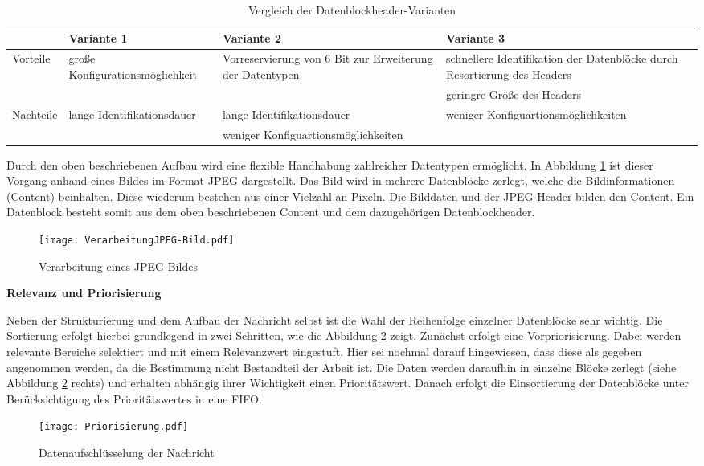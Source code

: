 \begin{longtable}[\textwidth]{|l|p{}|p{}|p{}|}
\caption{Vergleich der Datenblockheader-Varianten} \\
	\hline
	\label{tab:VorNachteileHeaderVarianten}
	\textbf{} & \textbf{Variante 1} & \textbf{Variante 2} & \textbf{Variante 3}\\
	\hline
	  Vorteile      &  große Konfigurationsmöglichkeit & Vorreservierung von $6$
	  Bit zur Erweiterung der Datentypen & schnellere Identifikation der
	  Datenblöcke durch Resortierung des Headers\\
	  & & & geringre Größe des Headers \\
	\hline
	  Nachteile      &  lange Identifikationsdauer & lange Identifikationsdauer &
	  weniger Konfiguartionsmöglichkeiten\\
	  & & weniger Konfiguartionsmöglichkeiten & \\
	\hline
\end{longtable}

Durch den oben beschriebenen Aufbau wird eine flexible Handhabung
zahlreicher Datentypen ermöglicht. In Abbildung \ref{fig:beispielJPG} ist
dieser Vorgang anhand eines Bildes im Format JPEG dargestellt. Das Bild wird in
mehrere Datenblöcke zerlegt, welche die Bildinformationen (Content) beinhalten.
Diese wiederum bestehen aus einer Vielzahl an Pixeln.
Die Bilddaten und der JPEG-Header bilden den Content. Ein Datenblock besteht
somit aus dem oben beschriebenen Content und dem dazugehörigen
Datenblockheader.

\begin{figure}[H]
	\centering
	\texttt{[image: VerarbeitungJPEG-Bild.pdf]}
	\caption{Verarbeitung eines JPEG-Bildes}
	\label{fig:beispielJPG}
\end{figure}

\textbf{Relevanz und Priorisierung}

Neben der Strukturierung und dem Aufbau der Nachricht selbst ist die
Wahl der Reihenfolge einzelner Datenblöcke sehr wichtig. Die Sortierung erfolgt
hierbei grundlegend in zwei Schritten, wie die Abbildung \ref{fig:priorisierungen}
zeigt. Zunächst erfolgt eine Vorpriorisierung. Dabei werden relevante Bereiche
selektiert und mit einem Relevanzwert eingestuft. Hier sei nochmal darauf
hingewiesen, dass diese als gegeben angenommen werden, da die Bestimmung nicht
Bestandteil der Arbeit ist. Die Daten werden daraufhin in einzelne Blöcke
zerlegt (siehe Abbildung \ref{fig:priorisierungen} rechts) und erhalten abhängig
ihrer Wichtigkeit einen Prioritätswert. Danach erfolgt die Einsortierung der
Datenblöcke unter Berücksichtigung des Prioritätswertes in eine \gls{FIFO}.

\begin{figure}[H]
	\centering
	\texttt{[image: Priorisierung.pdf]}
	\caption{Datenaufschlüsselung der Nachricht}
	\label{fig:priorisierungen}
\end{figure}
